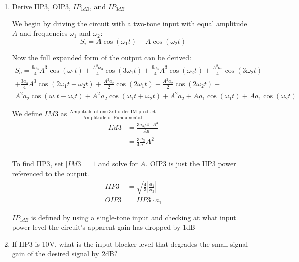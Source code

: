 \begin{enumerate}[label=(\alph*)]
    \item {\color{blue} Derive IIP3, OIP3, $IP_{1dB}$, and $IP_{3dB}$}

    We begin by driving the circuit with a two-tone input with equal amplitude $A$ and frequencies $\omega_1$ and $\omega_2$:
    $$ S_i = A \cos{\left (\omega_1 t \right )} + A \cos{\left (\omega_2 t \right )} $$

    Now the full expanded form of the output can be derived:
    \begin{align*}
    S_o = \frac{9 a_{3}}{4} A^{3} \cos{\left (\omega_1 t \right )} + \frac{A^{3} a_{3}}{4} \cos{\left (3 \omega_1 t \right )} + \frac{9 a_{3}}{4} A^{3} \cos{\left (\omega_2 t \right )} + \frac{A^{3} a_{3}}{4} \cos{\left (3 \omega_2 t \right )} \\
        + \frac{3 a_{3}}{4} A^{3} \cos{\left (2 \omega_1 t + \omega_2 t \right )} + \frac{A^{2} a_{2}}{2} \cos{\left (2 \omega_1 t \right )} + \frac{A^{2} a_{2}}{2} \cos{\left (2 \omega_2 t \right )} + \\
        A^{2} a_{2} \cos{\left (\omega_1 t - \omega_2 t \right )} + A^{2} a_{2} \cos{\left (\omega_1 t + \omega_2 t \right )} + A^{2} a_{2} + A a_{1} \cos{\left (\omega_1 t \right )} + A a_{1} \cos{\left (\omega_2 t \right )}
    \end{align*}

    We define $IM3$ as $\frac{\text{Amplitude of one 3rd order IM product}}{\text{Amplitude of Fundamental}}$
    \begin{align*}
        IM3 &= \frac{3 a_3 / 4 \cdot A^3}{A a_1} \\
        &= \frac{3}{4} \frac{a_3}{a_1} A^2 \\
    \end{align*}

    To find IIP3, set $|IM3| = 1$ and solve for $A$. OIP3 is just the IIP3 power referenced to the output.
    \begin{align*}
        IIP3 &= \sqrt{\frac{4}{3} |\frac{a_1}{a_3}|} \\
        OIP3 &= IIP3 \cdot a_1
    \end{align*}

    $IP_{1dB}$ is defined by using a single-tone input and checking at what input power level the circuit's apparent gain has dropped by 1dB 

    \item {\color{blue} If IIP3 is 10V, what is the input-blocker level that degrades the small-signal gain of the desired signal by 2dB?}


\end{enumerate}
